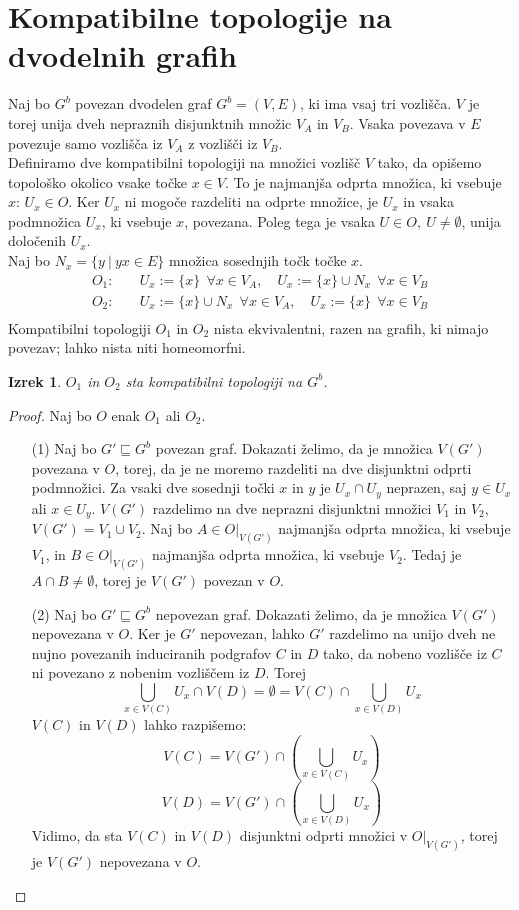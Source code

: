 \documentclass[a4paper, 12pt]{book}
\newtheorem{theorem}{Izrek}[section]
\theoremstyle{definition}
\theoremstyle{remark}
\begin{document}
\section{Kompatibilne topologije na dvodelnih grafih}
Naj bo $G^b$ povezan dvodelen graf $G^b = (V,E)$, ki ima vsaj tri vozlišča.
$V$ je torej unija dveh nepraznih disjunktnih množic $V_A$ in $V_B$. Vsaka
povezava v $E$ povezuje samo vozlišča iz $V_A$ z vozlišči iz $V_B$.\\
Definiramo dve kompatibilni topologiji na množici vozlišč $V$ tako, da opišemo
topološko okolico vsake točke $x \in V$. To je najmanjša odprta množica, ki
vsebuje $x$: $U_x \in O$. Ker $U_x$ ni mogoče razdeliti na odprte množice, je $U_x$
in vsaka podmnožica $U_x$, ki vsebuje $x$, povezana.
Poleg tega je vsaka $U \in O,\ U \neq \emptyset$, unija določenih $U_x$.\\
Naj bo $N_x = \{y \  | \  yx \in E\}$ množica sosednjih točk točke $x$.\\
\[
  \begin{split}
  O_1:&\quad
  U_x:=\{x\}\ \ \forall x \in V_A, \quad
  U_x:=\{x\}\cup N_x\ \  \forall x \in V_B\\
  O_2:&\quad
  U_x:=\{x\}\cup N_x\ \  \forall x \in V_A, \quad
  U_x:=\{x\}\ \ \forall x \in V_B\\
\end{split}
\]
Kompatibilni topologiji $O_1$ in $O_2$ nista ekvivalentni, razen na grafih,
ki nimajo povezav; lahko nista niti homeomorfni.
\begin{theorem}
  $O_1$ in $O_2$ sta kompatibilni topologiji na $G^b$.
\end{theorem}
\begin{proof}
  Naj bo $O$ enak $O_1$ ali $O_2$.
  \begin{itemize}
    \item[(1)] Naj bo $G' \sqsubseteq G^b$ povezan graf. Dokazati želimo, da je
    množica $V(G')$ povezana v $O$, torej, da je ne moremo razdeliti na dve
    disjunktni odprti podmnožici. Za vsaki dve sosednji točki $x$ in $y$ je
    $U_x \cap U_y$ neprazen, saj $y \in U_x$ ali $x \in U_y$. $V(G')$
    razdelimo na dve neprazni disjunktni množici $V_1$ in $V_2$,
    $V(G') = V_1 \cup V_2$. Naj bo $A \in O|_{V(G')}$
    najmanjša odprta množica, ki vsebuje $V_1$, in $B \in O|_{V(G')}$
    najmanjša odprta množica, ki vsebuje $V_2$. Tedaj je $A \cap B \neq \emptyset$,
    torej je $V(G')$ povezan v $O$.
    \item[(2)] Naj bo $G' \sqsubseteq G^b$ nepovezan graf. Dokazati želimo, da
    je množica $V(G')$ nepovezana v $O$. Ker je $G'$ nepovezan, lahko $G'$ razdelimo
    na unijo dveh ne nujno povezanih induciranih podgrafov $C$ in $D$ tako, da nobeno vozlišče iz $C$
    ni povezano z nobenim vozliščem iz $D$. Torej
    \[\bigcup_{x\in V(C)}U_x \cap V(D) = \emptyset = V(C) \cap \bigcup_{x\in V(D)}U_x\]
    $V(C)$ in $V(D)$ lahko razpišemo:
    \[V(C) = V(G') \cap \left(\bigcup_{x\in V(C)} U_x\right)\]
    \[V(D) = V(G') \cap \left(\bigcup_{x\in V(D)} U_x\right)\]
    Vidimo, da sta $V(C)$ in $V(D)$ disjunktni odprti množici v $O|_{V(G')}$,
    torej je $V(G')$ nepovezana v $O$.
  \end{itemize}
\end{proof}
\end{document}
